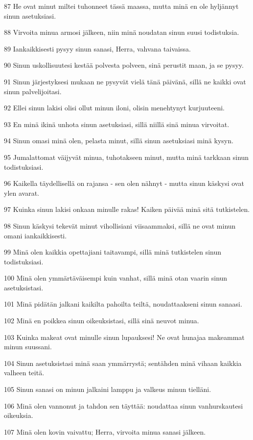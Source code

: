 \par 87 He ovat minut miltei tuhonneet tässä maassa, mutta minä en ole hyljännyt sinun asetuksiasi.
\par 88 Virvoita minua armosi jälkeen, niin minä noudatan sinun suusi todistuksia.
\par 89 Iankaikkisesti pysyy sinun sanasi, Herra, vahvana taivaissa.
\par 90 Sinun uskollisuutesi kestää polvesta polveen, sinä perustit maan, ja se pysyy.
\par 91 Sinun järjestyksesi mukaan ne pysyvät vielä tänä päivänä, sillä ne kaikki ovat sinun palvelijoitasi.
\par 92 Ellei sinun lakisi olisi ollut minun iloni, olisin menehtynyt kurjuuteeni.
\par 93 En minä ikinä unhota sinun asetuksiasi, sillä niillä sinä minua virvoitat.
\par 94 Sinun omasi minä olen, pelasta minut, sillä sinun asetuksiasi minä kysyn.
\par 95 Jumalattomat väijyvät minua, tuhotakseen minut, mutta minä tarkkaan sinun todistuksiasi.
\par 96 Kaikella täydellisellä on rajansa - sen olen nähnyt - mutta sinun käskysi ovat ylen avarat.
\par 97 Kuinka sinun lakisi onkaan minulle rakas! Kaiken päivää minä sitä tutkistelen.
\par 98 Sinun käskysi tekevät minut vihollisiani viisaammaksi, sillä ne ovat minun omani iankaikkisesti.
\par 99 Minä olen kaikkia opettajiani taitavampi, sillä minä tutkistelen sinun todistuksiasi.
\par 100 Minä olen ymmärtäväisempi kuin vanhat, sillä minä otan vaarin sinun asetuksistasi.
\par 101 Minä pidätän jalkani kaikilta pahoilta teiltä, noudattaakseni sinun sanaasi.
\par 102 Minä en poikkea sinun oikeuksistasi, sillä sinä neuvot minua.
\par 103 Kuinka makeat ovat minulle sinun lupauksesi! Ne ovat hunajaa makeammat minun suussani.
\par 104 Sinun asetuksistasi minä saan ymmärrystä; sentähden minä vihaan kaikkia valheen teitä.
\par 105 Sinun sanasi on minun jalkaini lamppu ja valkeus minun tielläni.
\par 106 Minä olen vannonut ja tahdon sen täyttää: noudattaa sinun vanhurskautesi oikeuksia.
\par 107 Minä olen kovin vaivattu; Herra, virvoita minua sanasi jälkeen.
